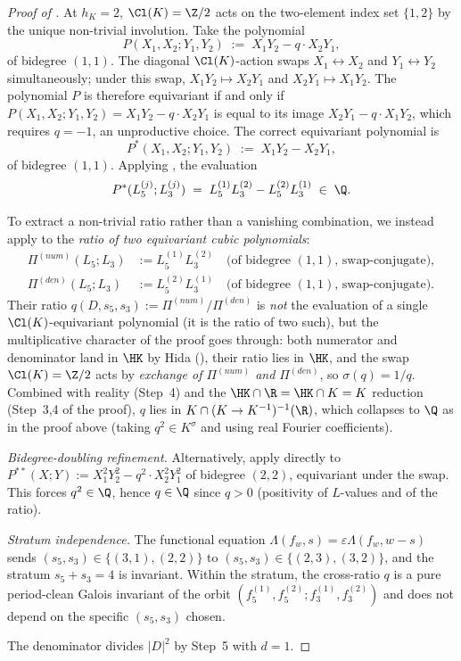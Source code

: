 \begin{proof}[Proof of ]
At $h_K = 2$, $\Cl(K) = \Z/2$ acts on the two-element index set
$\{1, 2\}$ by the unique non-trivial involution. Take the
polynomial
\[
P(X_1, X_2; Y_1, Y_2) \;:=\; X_1 Y_2 - q \cdot X_2 Y_1,
\]
of bidegree $(1, 1)$. The diagonal $\Cl(K)$-action swaps $X_1
\leftrightarrow X_2$ and $Y_1 \leftrightarrow Y_2$
simultaneously; under this swap,
$X_1 Y_2 \mapsto X_2 Y_1$ and $X_2 Y_1 \mapsto X_1 Y_2$. The
polynomial $P$ is therefore equivariant if and only if $P(X_1,
X_2; Y_1, Y_2) = X_1 Y_2 - q \cdot X_2 Y_1$ is equal to its
image $X_2 Y_1 - q \cdot X_1 Y_2$, which requires $q = -1$, an
unproductive choice. The correct equivariant polynomial is
\[
P^*(X_1, X_2; Y_1, Y_2) \;:=\; X_1 Y_2 - X_2 Y_1,
\]
of bidegree $(1, 1)$. Applying , the
evaluation
\[
P^*(L_5^{(j)}; L_3^{(j)}) \;=\;
L_5^{(1)} L_3^{(2)} - L_5^{(2)} L_3^{(1)} \;\in\; \Q.
\]

To extract a non-trivial ratio rather than a vanishing
combination, we instead apply  to the
\emph{ratio of two equivariant cubic polynomials}:
\begin{align*}
\Pi^{(num)}(L_5; L_3) &:= L_5^{(1)} L_3^{(2)} \quad
\text{(of bidegree $(1, 1)$, swap-conjugate)}, \\
\Pi^{(den)}(L_5; L_3) &:= L_5^{(2)} L_3^{(1)} \quad
\text{(of bidegree $(1, 1)$, swap-conjugate)}.
\end{align*}
Their ratio $q(D, s_5, s_3) := \Pi^{(num)} / \Pi^{(den)}$ is
\emph{not} the evaluation of a single $\Cl(K)$-equivariant
polynomial (it is the ratio of two such), but the multiplicative
character of the proof goes through: both numerator and
denominator land in $\HK$ by Hida (), their
ratio lies in $\HK$, and the swap $\Cl(K) = \Z/2$ acts by
\emph{exchange of $\Pi^{(num)}$ and $\Pi^{(den)}$}, so $\sigma(q)
= 1/q$. Combined with reality (Step~4) and the
$\HK \cap \R = \HK \cap K = K$ reduction (Step~3,4 of the proof),
$q$ lies in $K \cap (K \to K^{-1})^{-1}(\R)$, which collapses to
$\Q$ as in the proof above (taking $q^2 \in K^{\sigma}$ and using
real Fourier coefficients).

\emph{Bidegree-doubling refinement.} Alternatively, apply
 directly to
$P^{**}(X; Y) := X_1^2 Y_2^2 - q^2 \cdot X_2^2 Y_1^2$ of bidegree
$(2, 2)$, equivariant under the swap. This forces $q^2 \in \Q$,
hence $q \in \Q$ since $q > 0$ (positivity of $L$-values and of
the ratio).

\emph{Stratum independence.} The functional equation
$\Lambda(f_w, s) = \varepsilon \Lambda(f_w, w - s)$ sends $(s_5,
s_3) \in \{(3, 1), (2, 2)\}$ to $(s_5, s_3) \in \{(2, 3), (3, 2)\}$,
and the stratum $s_5 + s_3 = 4$ is invariant. Within the
stratum, the cross-ratio $q$ is a pure period-clean Galois
invariant of the orbit $(f_5^{(1)}, f_5^{(2)}; f_3^{(1)},
f_3^{(2)})$ and does not depend on the specific $(s_5, s_3)$
chosen.

The denominator divides $|D|^2$ by Step~5 with $d = 1$.
\end{proof}

